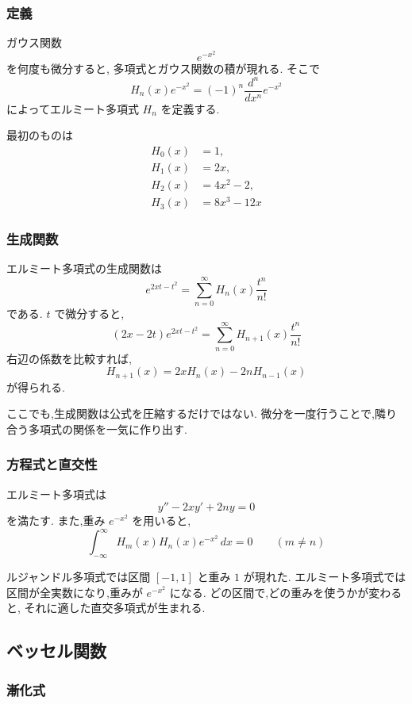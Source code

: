 \subsubsection{定義}

ガウス関数
\[
  e^{-x^2}
\]
を何度も微分すると,
多項式とガウス関数の積が現れる.
そこで
\[
  H_n(x)e^{-x^2}
  =(-1)^n\frac{d^n}{dx^n}e^{-x^2}
\]
によってエルミート多項式 $H_n$ を定義する.

最初のものは
\[
\begin{aligned}
  H_0(x)&=1,\\
  H_1(x)&=2x,\\
  H_2(x)&=4x^2-2,\\
  H_3(x)&=8x^3-12x
\end{aligned}
\]

\subsubsection{生成関数}

エルミート多項式の生成関数は
\[
  e^{2xt-t^2}
  =\sum_{n=0}^{\infty}H_n(x)\frac{t^n}{n!}
\]
である.
$t$ で微分すると,
\[
  (2x-2t)e^{2xt-t^2}
  =\sum_{n=0}^{\infty}H_{n+1}(x)\frac{t^n}{n!}
\]
右辺の係数を比較すれば,
\[
  H_{n+1}(x)=2xH_n(x)-2nH_{n-1}(x)
\]
が得られる.

ここでも,生成関数は公式を圧縮するだけではない.
微分を一度行うことで,隣り合う多項式の関係を一気に作り出す.

\subsubsection{方程式と直交性}

エルミート多項式は
\[
  y''-2xy'+2ny=0
\]
を満たす.
また,重み $e^{-x^2}$ を用いると,
\[
  \int_{-\infty}^{\infty}
  H_m(x)H_n(x)e^{-x^2}\,dx=0
  \qquad(m\neq n)
\]

ルジャンドル多項式では区間 $[-1,1]$ と重み $1$ が現れた.
エルミート多項式では区間が全実数になり,重みが $e^{-x^2}$ になる.
どの区間で,どの重みを使うかが変わると,
それに適した直交多項式が生まれる.

\subsection{ベッセル関数}

\subsubsection{漸化式}


